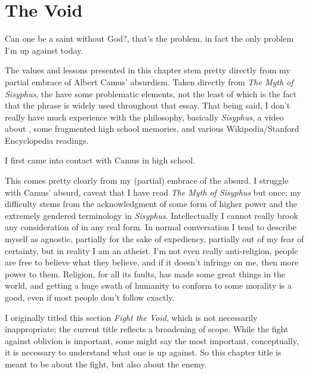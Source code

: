 \documentclass[../butidigress.tex]{subfiles}
\begin{document}
\chapter{The Void}\label{chap:thevoid}
\epigraph{Can one be a saint without God?, that's the problem, in fact the only problem I'm up against today.}{}
\newpage

The values and lessons presented in this chapter stem pretty directly from my partial embrace of Albert Camus' absurdism.
Taken directly from \textit{The Myth of Sisyphus}, the  have some problematic elements, not the least of which is the fact that the phrase  is widely used throughout that essay.
That being said, I don't really have much experience with the philosophy, basically \textit{Sisyphus}, a video about , some fragmented high school memories, and various Wikipedia/Stanford Encyclopedia readings.

I first came into contact with Camus in high school.


This comes pretty clearly from my (partial) embrace of the absurd.
I struggle with Camus' absurd, caveat that I have read \textit{The Myth of Sisyphus} but once; my difficulty stems from the acknowledgment of some form of higher power and the extremely gendered terminology in \textit{Sisyphus}.
Intellectually I cannot really brook any consideration of  in any real form.
In normal conversation I tend to describe myself as agnostic, partially for the sake of expediency, partially out of my fear of certainty, but in reality I am an atheist.
I'm not even really anti-religion, people are free to believe what they believe, and if it doesn't infringe on me, then more power to them.
Religion, for all its faults, has made some great things in the world, and getting a huge swath of humanity to conform to some morality is a good, even if most people don't follow exactly.

I originally titled this section \textit{Fight the Void}, which is not necessarily inappropriate; the current title reflects a broadening of scope.
While the fight against oblivion is important, some might say the most important, conceptually, it is necessary to understand what one is up against.
So this chapter title is meant to be about the fight, but also about the enemy.
\end{document}
